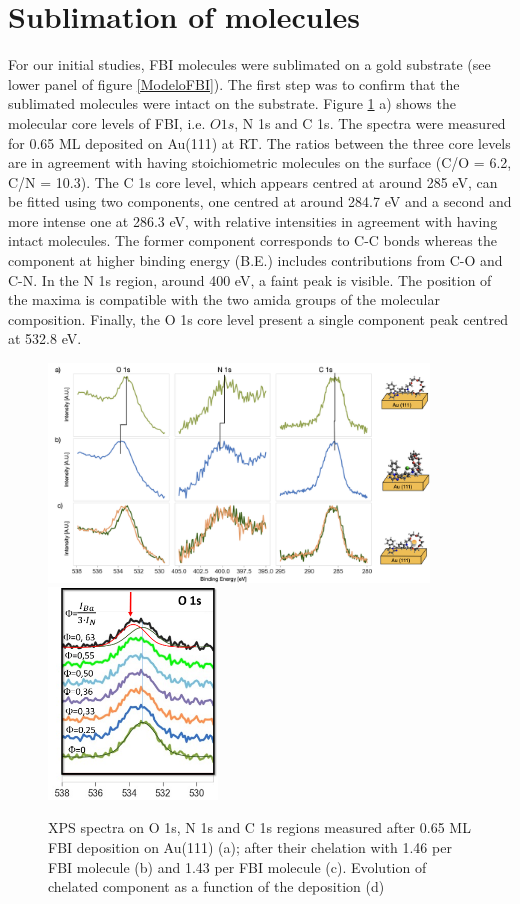 \documentclass[aps,prl,reprint,longbibliography,superscriptaddress, english]{revtex4-1}
\begin{document}
\section{Sublimation of molecules}
For our initial studies, FBI molecules were sublimated on a gold substrate (see lower panel of figure \ref{ModeloFBI}). The first step was 
to confirm that the sublimated molecules were intact on the substrate. Figure \ref{XPS_FBI_Au(111)} a) shows the molecular core levels of FBI, i.e. $O 1s$, N 1s and C 1s. The spectra were measured for 0.65 ML deposited on Au(111) at RT. The ratios between the three core levels are in agreement with having stoichiometric molecules on the surface (C/O = 6.2, C/N = 10.3). The C 1s core level, which appears centred at around 285 eV, can be fitted using two components, one centred at around 284.7 eV and a second and more intense one at 286.3 eV, with relative intensities in agreement with having intact molecules. The former component corresponds to C-C bonds whereas the component at higher binding energy (B.E.) includes contributions from C-O and C-N. In the N 1s region, around 400 eV, a faint peak is visible. The position of the maxima is compatible with the two amida groups of the molecular composition. Finally, the O 1s core level present a single component peak centred at 532.8 eV.

\begin{figure}[ht!]
	\includegraphics[width=0.9\textwidth]{figures/fig2_xps_chelation.a).png}
	\includegraphics[width=0.4\textwidth]{figures/XPS_O1s_evolution_Au.png}
	
	\caption{\label{XPS_FBI_Au(111)} 
    XPS spectra on O 1s, N 1s and C 1s regions measured after 0.65 ML FBI deposition on Au(111) (a); after their chelation with 1.46 \Bapp per FBI molecule (b) and 1.43 \Nap per FBI molecule (c). Evolution of chelated component as a function of the \Bapp deposition (d)}
\end{figure}  
\end{document}
